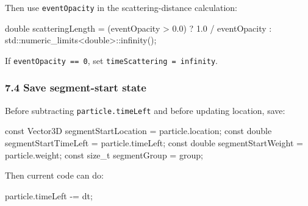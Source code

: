 \documentclass[
]{article}
\newenvironment{Shaded}{}{}
\newcommand{\AttributeTok}[1]{\textcolor[rgb]{0.49,0.56,0.16}{#1}}
\newcommand{\BuiltInTok}[1]{\textcolor[rgb]{0.00,0.50,0.00}{#1}}
\newcommand{\DataTypeTok}[1]{\textcolor[rgb]{0.56,0.13,0.00}{#1}}
\newcommand{\FloatTok}[1]{\textcolor[rgb]{0.25,0.63,0.44}{#1}}
\newcommand{\NormalTok}[1]{#1}
\newcommand{\OperatorTok}[1]{\textcolor[rgb]{0.40,0.40,0.40}{#1}}
\begin{document}
Then use \texttt{eventOpacity} in the scattering-distance calculation:

\begin{Shaded}
\begin{Highlighting}[]
\DataTypeTok{double}\NormalTok{ scatteringLength }\OperatorTok{=} \OperatorTok{(}\NormalTok{eventOpacity }\OperatorTok{\textgreater{}} \FloatTok{0.0}\OperatorTok{)} \OperatorTok{?} \FloatTok{1.0} \OperatorTok{/}\NormalTok{ eventOpacity }\OperatorTok{:} \BuiltInTok{std::}\NormalTok{numeric\_limits}\OperatorTok{\textless{}}\DataTypeTok{double}\OperatorTok{\textgreater{}::}\NormalTok{infinity}\OperatorTok{();}
\end{Highlighting}
\end{Shaded}

If \texttt{eventOpacity\ ==\ 0}, set
\texttt{timeScattering\ =\ infinity}.

\subsubsection{7.4 Save segment-start
state}\label{save-segment-start-state}

Before subtracting \texttt{particle.timeLeft} and before updating
location, save:

\begin{Shaded}
\begin{Highlighting}[]
\AttributeTok{const}\NormalTok{ Vector3D segmentStartLocation }\OperatorTok{=}\NormalTok{ particle}\OperatorTok{.}\NormalTok{location}\OperatorTok{;}
\AttributeTok{const} \DataTypeTok{double}\NormalTok{ segmentStartTimeLeft }\OperatorTok{=}\NormalTok{ particle}\OperatorTok{.}\NormalTok{timeLeft}\OperatorTok{;}
\AttributeTok{const} \DataTypeTok{double}\NormalTok{ segmentStartWeight }\OperatorTok{=}\NormalTok{ particle}\OperatorTok{.}\NormalTok{weight}\OperatorTok{;}
\AttributeTok{const} \DataTypeTok{size\_t}\NormalTok{ segmentGroup }\OperatorTok{=}\NormalTok{ group}\OperatorTok{;}
\end{Highlighting}
\end{Shaded}

Then current code can do:

\begin{Shaded}
\begin{Highlighting}[]
\NormalTok{particle}\OperatorTok{.}\NormalTok{timeLeft }\OperatorTok{{-}=}\NormalTok{ dt}\OperatorTok{;}
\end{Highlighting}
\end{Shaded}
\end{document}
